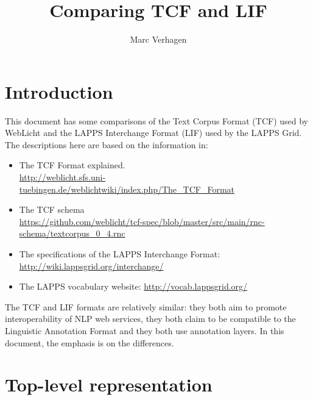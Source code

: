 \documentclass[11pt]{article}
\title{Comparing TCF and LIF}
\author{Marc Verhagen}
\begin{document}
\maketitle


\section{Introduction}

This document has some comparisons of the Text Corpus Format (TCF) used by WebLicht and the LAPPS Interchange Format (LIF) used by the LAPPS Grid. The descriptions here are based on the information in:

\begin{itemize}

\item The TCF Format explained.\\
{\color{blue}\href{http://weblicht.sfs.uni-tuebingen.de/weblichtwiki/index.php/The_TCF_Format}{http://weblicht.sfs.uni-tuebingen.de/weblichtwiki/index.php/The\_TCF\_Format}}

\item The TCF schema\\
{\color{blue}\href{https://github.com/weblicht/tcf-spec/blob/master/src/main/rnc-schema/textcorpus_0_4.rnc}{https://github.com/weblicht/tcf-spec/blob/master/src/main/rnc-schema/textcorpus\_0\_4.rnc}}

\item The specifications of the LAPPS Interchange Format:
{\color{blue}\href{http://wiki.lappsgrid.org/interchange/}{http://wiki.lappsgrid.org/interchange/}}

\item The LAPPS vocabulary website:
{\color{blue}\href{http://vocab.lappsgrid.org/}{http://vocab.lappsgrid.org/}}

\end{itemize}

The TCF and LIF formats are relatively similar: they both aim to promote interoperability of NLP web services, they both claim to be compatible to the Linguistic Annotation Format and they both use annotation layers. In this document, the emphasis is on the differences.


\section{Top-level representation}
\end{document}
